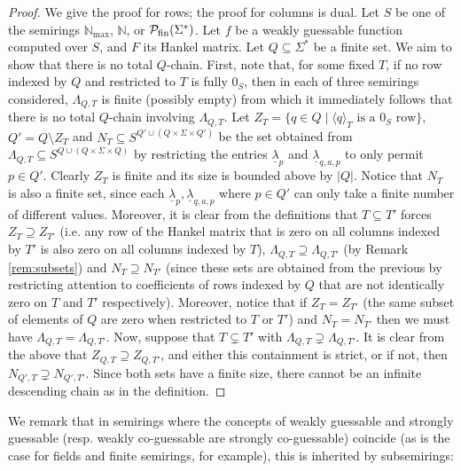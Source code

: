 \documentclass{lmcs}
\numberwithin{theorem}{section}
\begin{document}
	\begin{proof}
	We give the proof for rows; the proof for columns is dual. Let $S$ be one of the semirings $\mathbb{N}_{\max}$, $\mathbb{N}$, or $\mathcal{P}_{\rm fin}(\Sigma^*)$.
	Let $f$ be a weakly guessable function computed over $S$, and $F$ its Hankel matrix. Let $Q \subseteq \Sigma^*$ be a finite set. We aim to show that there is no total $Q$-chain.
	First, note that, for some fixed $T$, if no row indexed by $Q$ and restricted to $T$ is fully $0_S$, then in each of three semirings considered, $\Lambda_{Q,T}$ is finite (possibly empty) from which it immediately follows that there is no total $Q$-chain involving $\Lambda_{Q,T}$. Let $Z_{T} = \{q \in Q \mid \langle q \rangle_T \mbox{ is a }0_S \mbox { row}\}$, $Q' = Q \setminus Z_{T}$ and $N_{T} \subseteq S^{Q' \cup (Q \times \Sigma \times Q')}$ be the set obtained from $\Lambda_{Q,T} \subseteq S^{Q \cup (Q \times \Sigma \times Q)}$ by restricting the entries $\underline{\lambda}_p$ and $\underline{\lambda}_{q,a,p}$ to only permit $p \in Q'$. Clearly $Z_{T}$ is finite and its size is bounded above by $|Q|$. Notice that $N_{T}$ is also a finite set, since each  $\underline{\lambda}_p, \underline{\lambda}_{q,a,p}$ where $p \in Q'$ can only take a finite number of different values. 
	Moreover, it is clear from the definitions that $T \subseteq T'$ forces $Z_{T}\supseteq Z_{T'}$ (i.e. any row of the Hankel matrix that is zero on all columns indexed by $T'$ is also zero on all columns indexed by $T$), $\Lambda_{Q, T} \supseteq \Lambda_{Q, T'}$ (by Remark \ref{rem:subsets}) and $N_{T} \supseteq N_{T'}$ (since these sets are obtained from the previous by restricting attention to coefficients of rows indexed by $Q$ that are not identically zero on $T$ and $T'$ respectively).  Moreover, notice that if $Z_{T}=Z_{T'}$ (the same subset of elements of $Q$ are zero when restricted to $T$ or $T'$) and $N_T=N_{T'}$ then we must have $\Lambda_{Q, T}=\Lambda_{Q, T'}$. Now, suppose that $T \subsetneq T'$ with  $\Lambda_{Q, T} \supsetneq \Lambda_{Q, T'}$. It is clear from the above that $Z_{Q, T}\supseteq Z_{Q, T'}$, and either this containment is strict, or if not, then $N_{Q', T} \supsetneq N_{Q', T'}$. Since both sets have a finite size, there cannot be an infinite descending chain as in the definition.
\end{proof}


 We remark that in semirings where the concepts of weakly guessable and strongly guessable (resp. weakly co-guessable are strongly co-guessable) coincide (as is the case for fields and finite semirings, for example), this is inherited by subsemirings:
	
\end{document}
